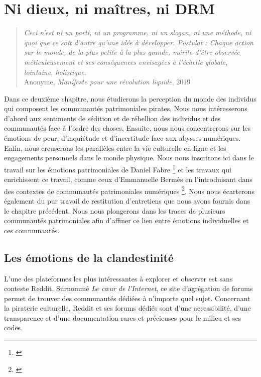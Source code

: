 \chapter{Ni dieux, ni maîtres, ni DRM}

\begin{quote}
    \textit{ Ceci n’est ni un parti, ni un programme, ni un slogan, ni une méthode, ni quoi que ce soit d’autre qu’une idée à développer. Postulat : Chaque action sur le monde, de la plus petite à la plus grande, mérite d’être observée méticuleusement et ses conséquences envisagées à l’échelle globale, lointaine, holistique. }\\

    Anonyme, \textit{Manifeste pour une révolution liquide}, 2019
\end{quote}


Dans ce deuxième chapitre, nous étudierons la perception du monde des individus qui composent les communautés patrimoniales pirates. Nous nous intéresserons d'abord aux sentiments de sédition et de rébellion des individus et des communautés face à l'ordre des choses. Ensuite, nous nous concentrerons sur les émotions de peur, d'inquiétude et d'incertitude face aux abysses numériques. Enfin, nous creuserons les parallèles entre la vie culturelle en ligne et les engagements personnels dans le monde physique. Nous nous inscrirons ici dans le travail sur les émotions patrimoniales de Daniel Fabre \footnote{\cite{fabre_emotions_2013}} et les travaux qui enrichissent ce travail, comme ceux d'Emmanuelle Bermès en l'introduisant dans des contextes de communautés patrimoniales numériques \footnote{\cite{bermes_lecran_2024}}. Nous nous écarterons également du pur travail de restitution d'entretiens que nous avons fournis dans le chapitre précédent. Nous nous plongerons dans les traces de plusieurs communautés patrimoniales afin d'affiner ce lien entre émotions individuelles et ces communautés.

\section{Les émotions de la clandestinité}

L'une des plateformes les plus intéressantes à explorer et observer est sans conteste Reddit. Surnommé  \textit{Le cœur de l'Internet}, ce site d'agrégation de forums permet de trouver des communautés dédiées à n'importe quel sujet. Concernant la piraterie culturelle, Reddit et ses forums dédiés sont d'une accessibilité, d'une transparence et d'une documentation rares et précieuses pour le milieu et ses codes. 

